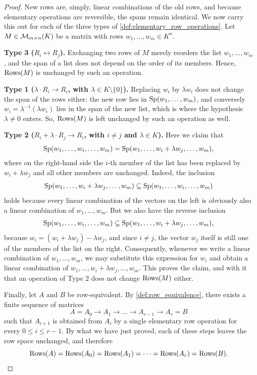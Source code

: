 \begin{proof}
New rows are, simply, linear combinations of the old rows, and because elementary operations are reversible, the spans remain identical. We now carry this out for each of the three types of \cref{def:elementary_row_operations}. Let $M \in \mathcal{M}_{m \times n}(K)$ be a matrix with rows $w_{1}, \dots, w_{m} \in K^{n}$.

\textbf{Type 3 ($R_{i} \leftrightarrow R_{j}$).} Exchanging two rows of $M$ merely reorders the list $w_{1}, \dots, w_{m}$, and the span of a list does not depend on the order of its members. Hence, $\operatorname{Rows}(M)$ is unchanged by such an operation.

\textbf{Type 1 ($\lambda \cdot R_{i} \to R_{i}$, with $\lambda \in K \setminus \{0\}$).} Replacing $w_{i}$ by $\lambda w_{i}$ does not change the span of the rows either: the new row lies in $\operatorname{Sp}(w_{1}, \dots, w_{m})$, and conversely $w_{i} = \lambda^{-1} (\lambda w_{i})$ lies in the span of the new list, which is where the hypothesis $\lambda \neq 0$ enters. So, $\operatorname{Rows}(M)$ is left unchanged by such an operation as well.

\textbf{Type 2 ($R_{i} + \lambda \cdot R_{j} \to R_{i}$, with $i \neq j$ and $\lambda \in K$).} Here we claim that
\[
\operatorname{Sp}(w_{1}, \dots, w_{i}, \dots, w_{m}) = \operatorname{Sp}(w_{1}, \dots, w_{i} + \lambda w_{j}, \dots, w_{m}),
\]
where on the right-hand side the $i$-th member of the list has been replaced by $w_{i} + \lambda w_{j}$ and all other members are unchanged. Indeed, the inclusion
\[
\operatorname{Sp}(w_{1}, \dots, w_{i} + \lambda w_{j}, \dots, w_{m}) \subseteq \operatorname{Sp}(w_{1}, \dots, w_{i}, \dots, w_{m})
\]
holds because every linear combination of the vectors on the left is obviously also a linear combination of $w_{1}, \dots, w_{m}$. But we also have the reverse inclusion
\[
\operatorname{Sp}(w_{1}, \dots, w_{i}, \dots, w_{m}) \subseteq \operatorname{Sp}(w_{1}, \dots, w_{i} + \lambda w_{j}, \dots, w_{m}),
\]
because $w_{i} = (w_{i} + \lambda w_{j}) - \lambda w_{j}$, and since $i \neq j$, the vector $w_{j}$ itself is still one of the members of the list on the right. Consequently, whenever we write a linear combination of $w_{1}, \dots, w_{m}$, we may substitute this expression for $w_{i}$ and obtain a linear combination of $w_{1}, \dots, w_{i} + \lambda w_{j}, \dots, w_{m}$. This proves the claim, and with it that an operation of Type 2 does not change $\operatorname{Rows}(M)$ either.

Finally, let $A$ and $B$ be row-equivalent. By \cref{def:row_equivalence}, there exists a finite sequence of matrices
\[
A = A_{0} \longrightarrow A_{1} \longrightarrow \dots \longrightarrow A_{r-1} \longrightarrow A_{r} = B
\]
such that $A_{i+1}$ is obtained from $A_{i}$ by a single elementary row operation for every $0 \le i \le r-1$. By what we have just proved, each of these steps leaves the row space unchanged, and therefore
\[
\operatorname{Rows}(A) = \operatorname{Rows}(A_{0}) = \operatorname{Rows}(A_{1}) = \dots = \operatorname{Rows}(A_{r}) = \operatorname{Rows}(B). \qedhere
\]
\end{proof}

